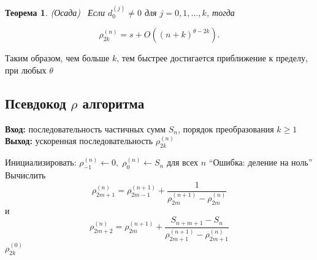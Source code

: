\documentclass[14pt, a4paper]{extarticle}
\newtheorem{theorem}{Теорема}[section] %
\theoremstyle{definition}
\theoremstyle{remark}
\begin{document}
\begin{theorem}(Осада)~\cite{Osada1993}
Если $d_{0}^{(j)} \neq 0$ для $j=0,1, \ldots, k$, тогда

\begin{equation*}
\rho_{2 k}^{(n)}=s+O\left((n+k)^{\theta-2 k}\right) .
\end{equation*}

\end{theorem}
Таким образом, чем больше $k$, тем быстрее достигается приближение к пределу, при любых $\theta$

\subsection{Псевдокод $\rho$ алгоритма}

\begin{algorithm}[H]
\caption{Алгоритм Винна ($\rho$-алгоритм)}
\textbf{Вход:} последовательность частичных сумм $S_n$, порядок преобразования $k \geq 1$ \\
\textbf{Выход:} ускоренная последовательность $\rho_{2k}^{(n)}$

\begin{algorithmic}[1]
\State Инициализировать: $\rho_{-1}^{(n)} \gets 0,\; \rho_{0}^{(n)} \gets S_n$ для всех $n$
            \State \Return ``Ошибка: деление на ноль''
        \EndIf
        \State Вычислить
        \[
        \rho_{2m+1}^{(n)} = \rho_{2m-1}^{(n+1)} + 
        \frac{1}{\rho_{2m}^{(n+1)} - \rho_{2m}^{(n)}}
        \]
        \State и
        \[
        \rho_{2m+2}^{(n)} = \rho_{2m}^{(n+1)} + 
        \frac{S_{n+m+1} - S_{n}}{\rho_{2m+1}^{(n+1)} - \rho_{2m+1}^{(n)}}
        \]
    \EndFor
\EndFor
\State \Return $\rho_{2k}^{(0)}$
\end{algorithmic}
\end{algorithm}





\end{document}
